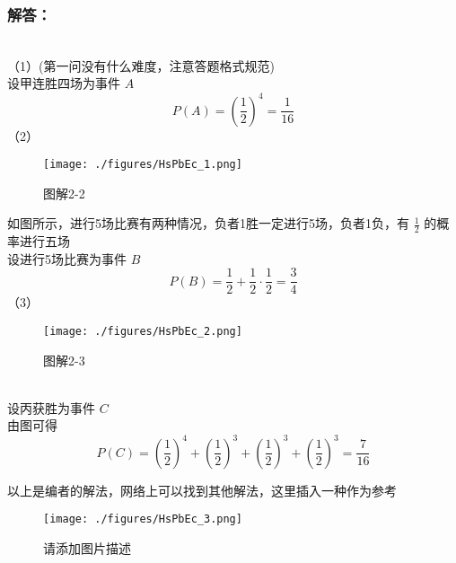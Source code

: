 \subsubsection{解答：}\\
（1）(第一问没有什么难度，注意答题格式规范)\\
设甲连胜四场为事件 $A$
\begin{equation}
P(A) = (\frac{1}{2})^4 = \frac{1}{16}
\end{equation}
（2）
\begin{figure}[ht]
\centering
\texttt{[image: ./figures/HsPbEc\_1.png]}
\caption{图解2-2} \label{HsPbEc_fig1}
\end{figure}
如图所示，进行5场比赛有两种情况，负者1胜一定进行5场，负者1负，有 $\frac{1}{2}$ 的概率进行五场\\
设进行5场比赛为事件 $B$
\begin{equation}
P(B) = \frac{1}{2} + \frac{1}{2} \cdot \frac{1}{2} = \frac{3}{4}
\end{equation}
（3）
\begin{figure}[ht]
\centering
\texttt{[image: ./figures/HsPbEc\_2.png]}
\caption{图解2-3} \label{HsPbEc_fig2}
\end{figure}\\
设丙获胜为事件 $C$\\
由图可得
\begin{equation}
P(C) = (\frac{1}{2})^4 + (\frac{1}{2})^3 + (\frac{1}{2})^3 + (\frac{1}{2})^3 = \frac{7}{16}
\end{equation}

以上是编者的解法，网络上可以找到其他解法，这里插入一种作为参考
\begin{figure}[ht]
\centering
\texttt{[image: ./figures/HsPbEc\_3.png]}
\caption{请添加图片描述} \label{HsPbEc_fig3}
\end{figure}